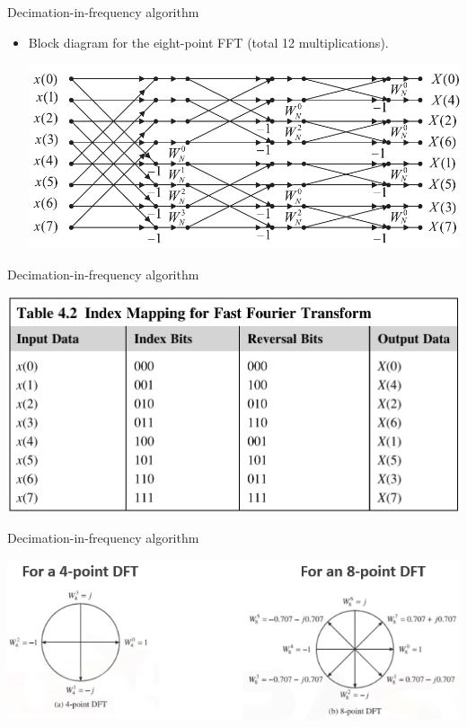 \documentclass[pdflatex,compress,mathserif]{beamer}
\begin{document}
\begin{frame}{Decimation-in-frequency algorithm}
	\begin{itemize}
		\item Block diagram for the eight-point FFT (total 12 multiplications).
		\begin{center}
			\includegraphics[width=\linewidth]{img/img17}
		\end{center}
	\end{itemize}
\end{frame}

\begin{frame}{Decimation-in-frequency algorithm}
	\begin{center}
		\includegraphics[width=\linewidth]{img/img17a}
	\end{center}
\end{frame}

\begin{frame}{Decimation-in-frequency algorithm}
	\begin{center}
		\includegraphics[width=\linewidth]{img/img17b}
	\end{center}
\end{frame}
\end{document}

